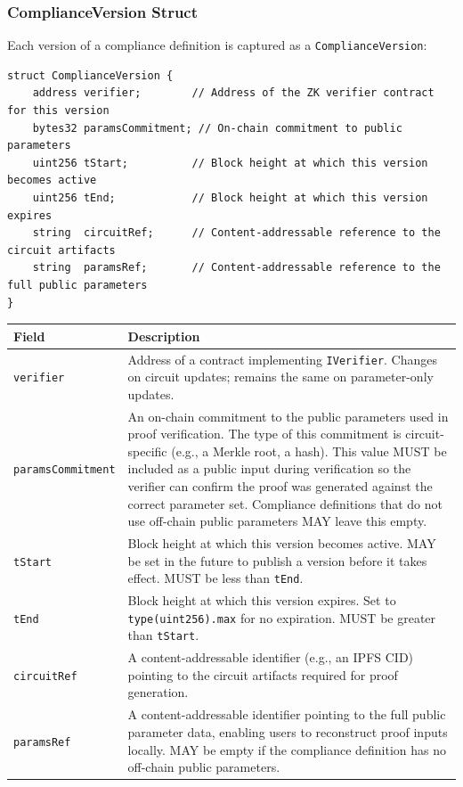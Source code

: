 \documentclass[9pt]{extreport}
\begin{document}
\subsubsection{ComplianceVersion Struct}
\label{sec:complianceversion-struct}

Each version of a compliance definition is captured as a \texttt{ComplianceVersion}:

\begin{singlespace}
\begin{lstlisting}[language=Solidity]
struct ComplianceVersion {
    address verifier;        // Address of the ZK verifier contract for this version
    bytes32 paramsCommitment; // On-chain commitment to public parameters
    uint256 tStart;          // Block height at which this version becomes active
    uint256 tEnd;            // Block height at which this version expires
    string  circuitRef;      // Content-addressable reference to the circuit artifacts
    string  paramsRef;       // Content-addressable reference to the full public parameters
}
\end{lstlisting}
\end{singlespace}

\begin{table}[h]
\centering
\small
\begin{tabular}{p{3cm}p{11cm}}
\toprule
\textbf{Field} & \textbf{Description} \\
\midrule
\texttt{verifier} & Address of a contract implementing \texttt{IVerifier}. Changes on circuit updates; remains the same on parameter-only updates. \\
\texttt{paramsCommitment} & An on-chain commitment to the public parameters used in proof verification. The type of this commitment is circuit-specific (e.g., a Merkle root, a hash). This value MUST be included as a public input during verification so the verifier can confirm the proof was generated against the correct parameter set. Compliance definitions that do not use off-chain public parameters MAY leave this empty. \\
\texttt{tStart} & Block height at which this version becomes active. MAY be set in the future to publish a version before it takes effect. MUST be less than \texttt{tEnd}. \\
\texttt{tEnd} & Block height at which this version expires. Set to \texttt{type(uint256).max} for no expiration. MUST be greater than \texttt{tStart}. \\
\texttt{circuitRef} & A content-addressable identifier (e.g., an IPFS CID) pointing to the circuit artifacts required for proof generation. \\
\texttt{paramsRef} & A content-addressable identifier pointing to the full public parameter data, enabling users to reconstruct proof inputs locally. MAY be empty if the compliance definition has no off-chain public parameters. \\
\bottomrule
\end{tabular}
\end{table}
\end{document}
